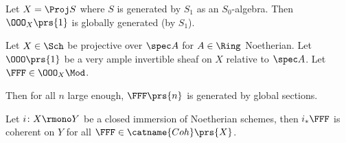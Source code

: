 \documentclass[10pt,a4paper,twoside,openany,hidelinks]{book}
\begin{document}
\begin{example}
Let $X = \Proj S$ where $S$ is generated by $S_1$ as an $S_0$-algebra. Then $\OOO_X\prs{1}$ is globally generated (by $S_1$).
\end{example}

\begin{theorem}[Serre]
Let $X \in \Sch$ be projective over $\spec A$ for $A \in \Ring$ Noetherian.
Let $\OOO\prs{1}$ be a very ample invertible sheaf on $X$ relative to $\spec A$.
Let $\FFF \in \OOO_X\Mod$.

Then for all $n$ large enough, $\FFF\prs{n}$ is generated by global sections.
\end{theorem}

\begin{exercise}
Let $i \colon X \rmono Y$ be a closed immersion of Noetherian schemes, then $i_*\FFF$ is coherent on $Y$ for all $\FFF \in \catname{Coh}\prs{X}$.
\end{exercise}

\backmatter
\end{document}
